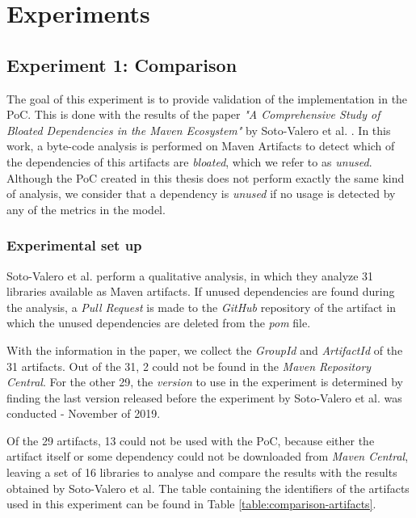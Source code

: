 \chapter{Experiments}\label{ch:Experiments}

\section{Experiment 1: Comparison}\label{sec:Exp1}
The goal of this experiment is to provide validation of the implementation in the PoC. This is done with the results of the paper \textit{"A Comprehensive Study of Bloated Dependencies in the Maven Ecosystem"} by Soto-Valero et al. \cite{soto2020comprehensive}. In this work, a byte-code analysis is performed on Maven Artifacts to detect which of the dependencies of this artifacts are \textit{bloated}, which we refer to as \textit{unused}. Although the PoC created in this thesis does not perform exactly the same kind of analysis, we consider that a dependency is \textit{unused} if no usage is detected by any of the metrics in the model.

\subsection{Experimental set up}
Soto-Valero et al. perform a qualitative analysis, in which they analyze 31 libraries available as Maven artifacts. If unused dependencies are found during the analysis, a \textit{Pull Request} is made to the \textit{GitHub} repository of the artifact in which the unused dependencies are deleted from the \textit{pom} file.

With the information in the paper, we collect the \textit{GroupId} and \textit{ArtifactId} of the 31 artifacts. Out of the 31, 2 could not be found in the \textit{Maven Repository Central}. For the other 29, the \textit{version} to use in the experiment is determined by finding the last version released before the experiment by Soto-Valero et al. was conducted - November of 2019.

Of the 29 artifacts, 13 could not be used with the PoC, because either the artifact itself or some dependency could not be downloaded from \textit{Maven Central}, leaving a set of 16 libraries to analyse and compare the results with the results obtained by Soto-Valero et al. The table containing the identifiers of the artifacts used in this experiment can be found in Table \ref{table:comparison-artifacts}.

